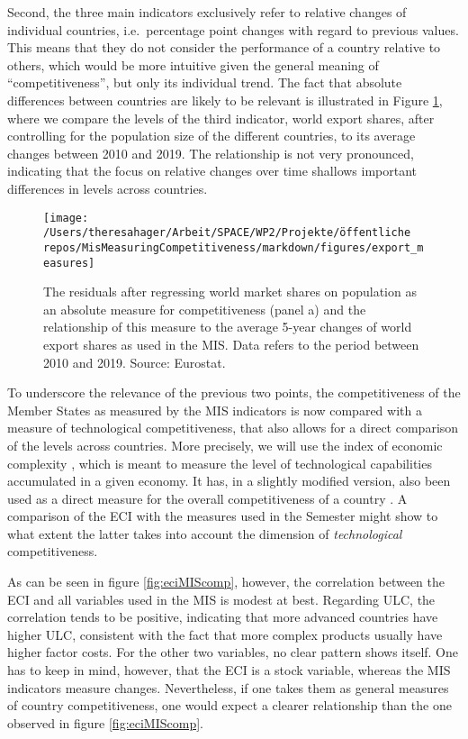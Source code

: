 \documentclass[
]{article}
\begin{document}
Second, the three main indicators exclusively refer to relative changes
of individual countries, i.e.~percentage point changes with regard to previous
values. This means that they do not consider the performance of a
country relative to others, which would be more
intuitive given the general meaning of \enquote{competitiveness}, but only its
individual trend.
The fact that absolute differences between countries are likely to be relevant is illustrated in
Figure \ref{fig:abschanges}, where we compare the levels of the third indicator,
world export shares, after controlling for the population size of the different
countries, to its average changes between 2010 and 2019. The relationship is
not very pronounced, indicating that the focus on relative changes
over time shallows important differences in levels across countries.

\begin{figure}

{\centering \texttt{[image: /Users/theresahager/Arbeit/SPACE/WP2/Projekte/öffentliche repos/MisMeasuringCompetitiveness/markdown/figures/export\_measures]} 

}

\caption{The residuals after regressing world market shares on population as an absolute measure for competitiveness (panel a) and the relationship of this measure to the average 5-year changes of world export shares as used in the MIS. Data refers to the period between 2010 and 2019. Source: Eurostat.}\label{fig:abschanges}
\end{figure}

To underscore the relevance of the previous two points, the
competitiveness of the Member States as measured by the MIS indicators
is now compared with a
measure of technological competitiveness, that also allows for a direct
comparison of the levels across countries. More precisely,
we will use the index of economic complexity \citep[ECI, ][]{Hidalgo.2009}, which
is meant to measure the level of technological capabilities accumulated in a
given economy. It has, in a slightly modified version, also been used as a
direct measure for the overall competitiveness of a country \citep{Tacchella.2013}.
A comparison of the ECI with the measures used in the Semester might show to what
extent the latter takes into account the dimension of \emph{technological}
competitiveness.

As can be seen in figure \ref{fig:eciMIScomp}, however, the correlation between the ECI
and all variables used in the MIS is modest at best. Regarding ULC, the
correlation tends to be positive, indicating that more advanced countries have
higher ULC, consistent with the fact that more complex products usually have
higher factor costs. For the other two variables, no clear pattern shows itself.
One has to keep in mind, however, that the ECI is a stock variable, whereas the
MIS indicators measure changes.
Nevertheless, if one takes them as general measures of country
competitiveness, one would expect a clearer relationship than the one observed
in figure \ref{fig:eciMIScomp}.
\end{document}
